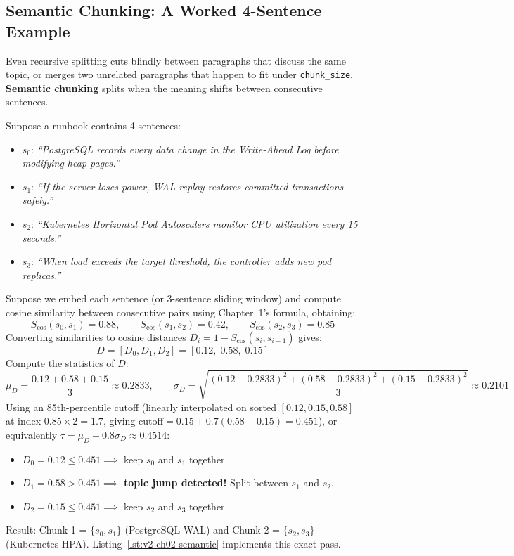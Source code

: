 \subsection{Semantic Chunking: A Worked 4-Sentence Example}
Even recursive splitting cuts blindly between paragraphs that discuss the same topic, or merges two unrelated paragraphs that happen to fit under \texttt{chunk\_size}. \textbf{Semantic chunking} splits when the meaning shifts between consecutive sentences.

Suppose a runbook contains 4 sentences:
\begin{itemize}[leftmargin=18pt]
  \item $s_0$: \emph{``PostgreSQL records every data change in the Write-Ahead Log before modifying heap pages.''}
  \item $s_1$: \emph{``If the server loses power, WAL replay restores committed transactions safely.''}
  \item $s_2$: \emph{``Kubernetes Horizontal Pod Autoscalers monitor CPU utilization every 15 seconds.''}
  \item $s_3$: \emph{``When load exceeds the target threshold, the controller adds new pod replicas.''}
\end{itemize}
Suppose we embed each sentence (or 3-sentence sliding window) and compute cosine similarity between consecutive pairs using Chapter~1's formula, obtaining:
\[
S_{\cos}(s_0, s_1) = 0.88, \qquad S_{\cos}(s_1, s_2) = 0.42, \qquad S_{\cos}(s_2, s_3) = 0.85
\]
Converting similarities to cosine distances $D_i = 1 - S_{\cos}(s_i, s_{i+1})$ gives:
\[
D = [D_0, D_1, D_2] = [0.12,\; 0.58,\; 0.15]
\]
Compute the statistics of $D$:
\[
\mu_D = \frac{0.12 + 0.58 + 0.15}{3} \approx 0.2833, \qquad \sigma_D = \sqrt{\frac{(0.12-0.2833)^2 + (0.58-0.2833)^2 + (0.15-0.2833)^2}{3}} \approx 0.2101
\]
Using an 85th-percentile cutoff (linearly interpolated on sorted $[0.12, 0.15, 0.58]$ at index $0.85 \times 2 = 1.7$, giving $\text{cutoff} = 0.15 + 0.7(0.58 - 0.15) = 0.451$), or equivalently $\tau = \mu_D + 0.8\sigma_D \approx 0.4514$:
\begin{itemize}[leftmargin=18pt]
  \item $D_0 = 0.12 \le 0.451 \implies$ keep $s_0$ and $s_1$ together.
  \item $D_1 = 0.58 > 0.451 \implies$ \textbf{topic jump detected!} Split between $s_1$ and $s_2$.
  \item $D_2 = 0.15 \le 0.451 \implies$ keep $s_2$ and $s_3$ together.
\end{itemize}
Result: Chunk 1 = $\{s_0, s_1\}$ (PostgreSQL WAL) and Chunk 2 = $\{s_2, s_3\}$ (Kubernetes HPA). Listing~\ref{lst:v2-ch02-semantic} implements this exact pass.

